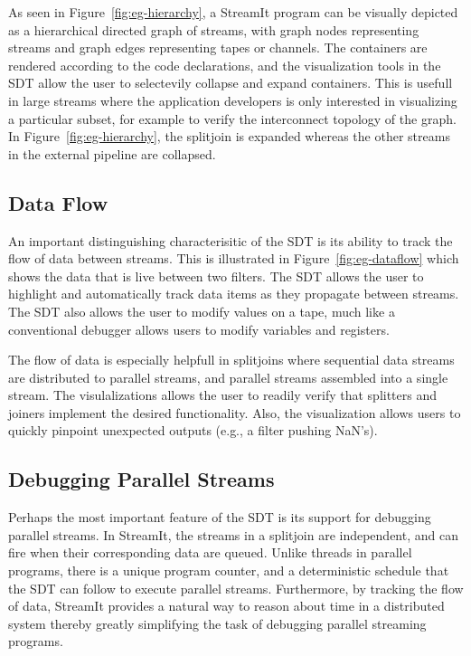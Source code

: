 \documentclass[11pt, letterpaper, onecolumn]{article}
\begin{document}
As seen  in Figure~\ref{fig:eg-hierarchy},  a StreamIt program  can be
visually depicted  as a hierarchical  directed graph of  streams, with
graph nodes representing streams and graph edges representing tapes or
channels.   The   containers  are  rendered  according   to  the  code
declarations, and the visualization tools in the SDT allow the user to
selectevily collapse  and expand containers. This is  usefull in large
streams  where  the  application  developers  is  only  interested  in
visualizing   a  particular   subset,  for   example  to   verify  the
interconnect topology of  the graph. In Figure~\ref{fig:eg-hierarchy},
the splitjoin  is expanded whereas  the other streams in  the external
pipeline are collapsed.


\subsection{Data Flow}

An important distinguishing characterisitic  of the SDT is its ability
to track  the flow  of data between  streams.  This is  illustrated in
Figure~\ref{fig:eg-dataflow} which shows the data that is live between
two filters.  The  SDT allows the user to  highlight and automatically
track  data items  as they  propagate between  streams.  The  SDT also
allows the user  to modify values on a tape,  much like a conventional
debugger allows users to modify variables and registers.

The flow of data is especially helpfull in splitjoins where sequential
data streams are distributed to parallel streams, and parallel streams
assembled into a single stream. The visulalizations allows the user to
readily  verify  that  splitters  and joiners  implement  the  desired
functionality.  Also,  the   visualization  allows  users  to  quickly
pinpoint unexpected outputs (e.g., a filter pushing NaN's).


\subsection{Debugging Parallel Streams}

Perhaps  the most  important feature  of the  SDT is  its  support for
debugging parallel  streams. In StreamIt,  the streams in  a splitjoin
are  independent,  and can  fire  when  their  corresponding data  are
queued. Unlike threads in parallel programs, there is a unique program
counter,  and a  deterministic schedule  that  the SDT  can follow  to
execute parallel streams.  Furthermore,  by tracking the flow of data,
StreamIt provides a natural way  to reason about time in a distributed
system  thereby greatly  simplifying  the task  of debugging  parallel
streaming programs.
\end{document}
